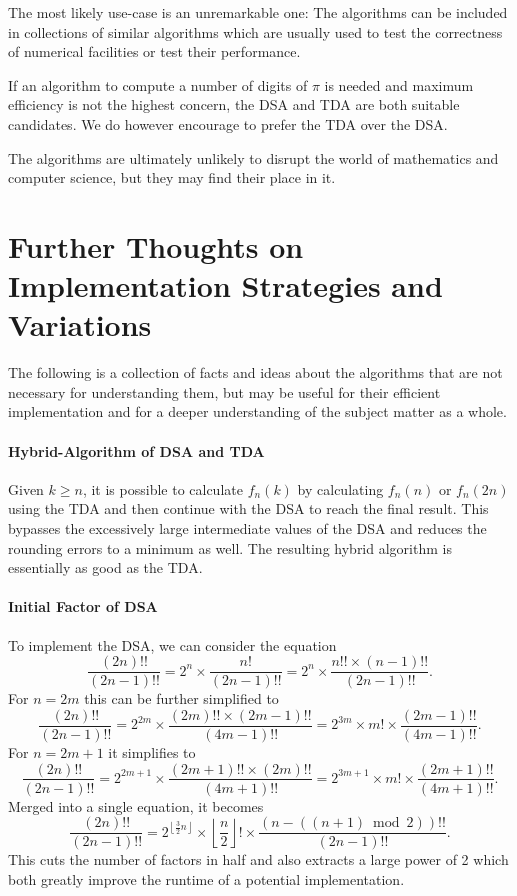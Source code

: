 \documentclass[a4paper,11pt]{scrartcl}
\theoremstyle{definition}
\theoremstyle{plain}
\theoremstyle{remark}
\begin{document}
The most likely use-case is an unremarkable one:
The algorithms can be included in collections of similar algorithms which are usually used to test the correctness of numerical facilities or test their performance.

If an algorithm to compute a number of digits of $\pi$ is needed and maximum efficiency is not the highest concern, the DSA and TDA are both suitable candidates.
We do however encourage to prefer the TDA over the DSA.

The algorithms are ultimately unlikely to disrupt the world of mathematics and computer science, but they may find their place in it.

\section{Further Thoughts on Implementation Strategies and Variations}

The following is a collection of facts and ideas about the algorithms that are not necessary for understanding them, but may be useful for their efficient implementation and for a deeper understanding of the subject matter as a whole.

\paragraph*{Hybrid-Algorithm of DSA and TDA}
Given $k \geq n$, it is possible to calculate $f_n(k)$ by calculating $f_n(n)$ or $f_{n}(2n)$ using the TDA and then continue with the DSA to reach the final result.
This bypasses the excessively large intermediate values of the DSA and reduces the rounding errors to a minimum as well.
The resulting hybrid algorithm is essentially as good as the TDA.

\paragraph*{Initial Factor of DSA}
To implement the DSA, we can consider the equation
\[
\frac{(2n)!!}{(2n-1)!!}
= 2^n \times \frac{n!}{(2n-1)!!}
= 2^n \times \frac{n!! \times (n-1)!!}{(2n-1)!!}.
\]
For $n = 2m$ this can be further simplified to
\[
\frac{(2n)!!}{(2n-1)!!}
= 2^{2m} \times \frac{(2m)!! \times (2m-1)!!}{(4m-1)!!}
= 2^{3m} \times m! \times \frac{(2m-1)!!}{(4m-1)!!}.
\]
For $n=2m+1$ it simplifies to
\[
\frac{(2n)!!}{(2n-1)!!}
= 2^{2m+1} \times \frac{(2m+1)!! \times (2m)!!}{(4m+1)!!}
= 2^{3m+1} \times m! \times \frac{(2m+1)!!}{(4m+1)!!}.
\]
Merged into a single equation, it becomes
\[
\frac{(2n)!!}{(2n-1)!!}
= 2^{\left\lfloor \frac{3}{2}n \right\rfloor} \times \left\lfloor \frac{n}{2} \right\rfloor ! \times \frac{(n - ((n + 1) \bmod 2))!!}{(2n - 1)!!}.
\]
This cuts the number of factors in half and also extracts a large power of 2 which both greatly improve the runtime of a potential implementation.
\end{document}
